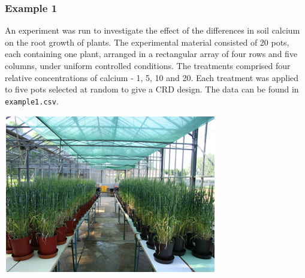 \begin{frame}\frametitle{Example 1}

An experiment was run to investigate the effect of the differences in soil calcium on the root growth of plants. The
experimental material consisted of 20 pots, each containing one plant, arranged in a rectangular array of four rows and
five columns, under uniform controlled conditions. The treatments comprised four relative concentrations of calcium -
1, 5, 10 and 20. Each treatment was applied to five pots selected at random to give a CRD design. The data can be found
in \texttt{example1.csv}.


\vspace{1cm}
\begin{center}
\includegraphics[height = 0.6\textheight]{glasshouse.png}
\end{center}
\end{frame}

